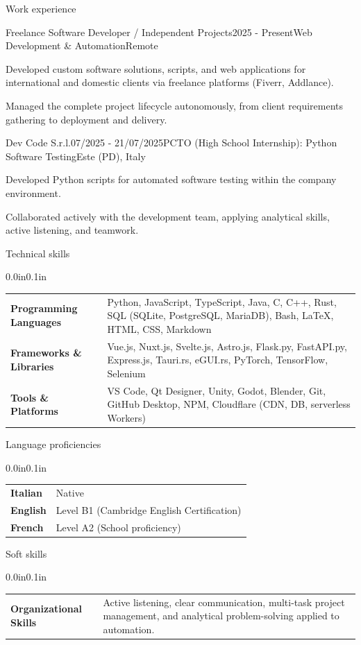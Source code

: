 \documentclass{resume} %
\makeatletter
\newcommand{\entry}[2]{#1 & #2 \tabularnewline} %
\newcommand{\tableEnv}[2]{%
  \begin{rSection}{#1} %
    \begin{adjustwidth}{0.0in}{0.1in} %
      \begin{tabularx}{\linewidth}{@{} >{\bfseries}l @{\hspace{6ex}} X @{}}
        #2 %
      \end{tabularx}
    \end{adjustwidth}
  \end{rSection}
}
\makeatother
\begin{document}
\begin{rSection}{Work experience}

    \begin{rSubsection}{Freelance Software Developer / Independent Projects}{2025 - Present}{Web Development \& Automation}{Remote}
        \item Developed custom software solutions, scripts, and web applications for international and domestic clients via freelance platforms (Fiverr, Addlance).
        \item Managed the complete project lifecycle autonomously, from client requirements gathering to deployment and delivery.
    \end{rSubsection}

    \begin{rSubsection}{Dev Code S.r.l.}{07/2025 - 21/07/2025}{PCTO (High School Internship): Python Software Testing}{Este (PD), Italy}
        \item Developed Python scripts for automated software testing within the company environment.
        \item Collaborated actively with the development team, applying analytical skills, active listening, and teamwork.
    \end{rSubsection}

\end{rSection}


\tableEnv{Technical skills}{
    \entry{Programming Languages}{Python, JavaScript, TypeScript, Java, C, C++, Rust, SQL (SQLite, PostgreSQL, MariaDB), Bash, \LaTeX, HTML, CSS, Markdown}
    \entry{Frameworks \& Libraries}{Vue.js, Nuxt.js, Svelte.js, Astro.js, Flask.py, FastAPI.py, Express.js, Tauri.rs, eGUI.rs, PyTorch, TensorFlow, Selenium}
    \entry{Tools \& Platforms}{VS Code, Qt Designer, Unity, Godot, Blender, Git, GitHub Desktop, NPM, Cloudflare (CDN, DB, serverless Workers)}
}


\tableEnv{Language proficiencies}{
    \entry{Italian}{Native}
    \entry{English}{Level B1 (Cambridge English Certification)}
    \entry{French}{Level A2 (School proficiency)}
}


\tableEnv{Soft skills}{
    \entry{Organizational Skills}{Active listening, clear communication, multi-task project management, and analytical problem-solving applied to automation.}
}
\end{document}

